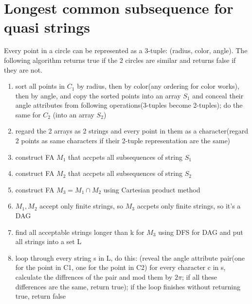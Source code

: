 \documentclass{article}
\begin{document}
\section{Longest common subsequence for quasi strings}
Every point in a circle can be represented as a 3-tuple: (radius, color, angle).
The following algorithm returns true if the 2 circles are similar and returns
false if they are not.
\begin{enumerate}
  \item sort all points in $C_1$ by radius, then by color(any ordering for
  color works), then by angle, and copy the sorted points into an array $S_1$
  and conceal their angle attributes from following operations(3-tuples become
  2-tuples); do the same for $C_2$ (into an array $S_2$)
  \item regard the 2 arrays as 2 strings and every point in them as a
  character(regard 2 points as same characters if their 2-tuple representation
  are the same)
  \item construct FA $M_1$ that accpets all subsequences of string $S_1$
  \item construct FA $M_2$ that accpets all subsequences of string $S_2$
  \item construct FA $M_3  = M_1 \cap M_2$ using Cartesian product method
  \item $M_1, M_2$ accept only finite strings, so $M_3$ accpets only finite
  strings, so it's a DAG
  \item find all acceptable strings longer than k for $M_3$ using DFS for DAG
  and put all strings into a set L
  \item loop through every string s in L, do this: (reveal the angle
  attribute pair(one for the point in C1, one for the point in C2) for every character c in s, calculate
  the diffrences of the pair and mod them by $2 \pi$; if all these differences
  are the same, return true); if the loop finishes without returning true,
  return false
\end{enumerate}
\end{document}
